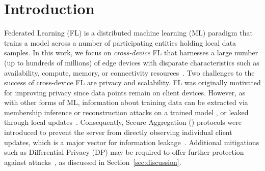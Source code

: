 \section{Introduction}
\label{sec:intro}

Federated Learning (FL) is a distributed machine learning (ML) paradigm that trains a model across a number of participating entities holding local data samples.
In this work, we focus on \emph{cross-device} FL that harnesses a large number (up to hundreds of millions) of edge devices with disparate characteristics such as availability, compute, memory, or connectivity
resources~\citep{kairouz2019advances}. %
Two challenges to the success of cross-device FL are privacy and scalability. 
FL was originally motivated for improving privacy since data points remain on client devices. 
However, as with other forms of ML, information about training data can be extracted via membership inference or reconstruction attacks on a trained model \citep{carlini2021membership,carlini2020extracting}, or leaked through local updates~\citep{MelisSCS19,geiping2020inverting}. 
Consequently, Secure Aggregation (\SecAgg) protocols were introduced to prevent the server from directly observing individual client updates, which is a major vector for information leakage~\citep{bonavitz2019federated,huba2021papaya}. 
Additional mitigations such as  Differential Privacy (DP) may be required to offer further protection 
against attacks~\citep{dwork2006calibrating,abadi2016deep}, as discussed in Section~\ref{sec:discussion}.

